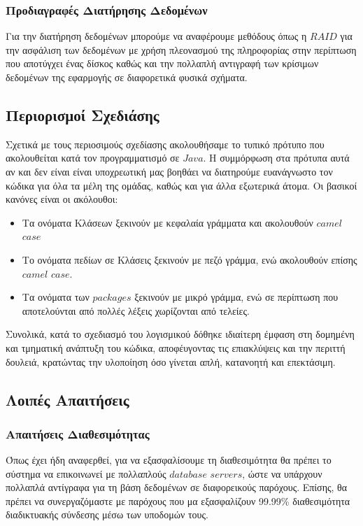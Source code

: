 \documentclass[12pt]{article}
\begin{document}
\subsubsection{Προδιαγραφές Διατήρησης Δεδομένων}

Για την διατήρηση δεδομένων μπορούμε να αναφέρουμε μεθόδους όπως η $RAID$ για την ασφάλιση των δεδομένων με χρήση πλεονασμού της πληροφορίας στην περίπτωση που αποτύγχει ένας δίσκος καθώς και την πολλαπλή αντιγραφή των κρίσιμων δεδομένων της εφαρμογής σε διαφορετικά φυσικά σχήματα.

\subsection{Περιορισμοί Σχεδιάσης}

Σχετικά με τους περιοσιμούς σχεδίασης ακολουθήσαμε το τυπικό πρότυπο που ακολουθείται κατά τον προγραμματισμό σε $Java$. Η συμμόρφωση στα πρότυπα αυτά αν και δεν είναι είναι υποχρεωτική μας βοηθάει να διατηρούμε ευανάγνωστο τον κώδικα για όλα τα μέλη της ομάδας, καθώς και για άλλα εξωτερικά άτομα. Οι βασικοί κανόνες είναι οι ακόλουθοι:

\begin{itemize}
\item Τα ονόματα Κλάσεων ξεκινούν με κεφαλαία γράμματα και ακολουθούν $camel$ $case$
\item Το ονόματα πεδίων σε Κλάσεις ξεκινούν με πεζό γράμμα, ενώ ακολουθούν επίσης $camel$ $case$.
\item Τα ονόματα των $packages$ ξεκινούν με μικρό γράμμα, ενώ σε περίπτωση που αποτελούνται από πολλές λέξεις χωρίζονται από τελείες. 
\end{itemize}

Συνολικά, κατά το σχεδιασμό του λογισμικού δόθηκε ιδιαίτερη έμφαση στη δομημένη και τμηματική ανάπτυξη του κώδικα, αποφέυγοντας τις επιακλύψεις και την περιττή δουλειά, κρατώντας την υλοποίηση όσο γίνεται απλή, κατανοητή και επεκτάσιμη.

\subsection{Λοιπές Απαιτήσεις}

\subsubsection{Απαιτήσεις Διαθεσιμότητας}

Όπως έχει ήδη αναφερθεί, για να εξασφαλίσουμε τη διαθεσιμότητα θα πρέπει το σύστημα να επικοινωνεί με πολλαπλούς $database$ $servers$, ώστε να υπάρχουν πολλαπλά αντίγραφα για τη βάση δεδομένων σε διαφορεικούς παρόχους. Επίσης, θα πρέπει να συνεργαζόμαστε με παρόχους που μα εξασφαλίζουν 99.99\% διαθεσιμότητα διαδικτυακής σύνδεσης μέσω των υποδομών τους.
\end{document}
